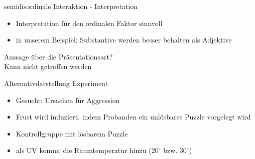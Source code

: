 \documentclass{beamer}
\begin{document}
	\begin{frame}{semidisordinale Interaktion - Interpretation}
		\begin{itemize}
			\item Interpretation für den ordinalen Faktor sinnvoll
			\item in unserem Beispiel: Substantive werden besser behalten als Adjektive
		\end{itemize}
		\alert{Aussage über die Präsentationsart?}
		\pause \\
		Kann nicht getroffen werden
	\end{frame}
	
	\begin{frame}{Alternativdarstellung}
		Experiment
		\begin{itemize}
			\item Gesucht: Ursachen für Aggression
			\item Frust wird induziert, indem Probanden ein unlösbares Puzzle vorgelegt wird
			\item Kontrollgruppe mit lösbarem Puzzle
			\item als UV kommt die Raumtemperatur hinzu (20$^{\circ}$ bzw. 30$^{\circ}$)
		\end{itemize}
	\end{frame}
	
\end{document}
